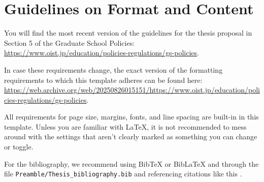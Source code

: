 
\chapter{Guidelines on Format and Content} \label{ch-1}

You will find the most recent version of the guidelines for the thesis proposal in Section 5 of the Graduate School Policies: \url{https://www.oist.jp/education/policies-regulations/gs-policies}.

In case these requirements change, the exact version of the formatting requirements to which this template adheres can be found here: \url{https://web.archive.org/web/20250826015151/https://www.oist.jp/education/policies-regulations/gs-policies}.

All requirements for page size, margins, fonts, and line spacing are built-in
in this template. Unless you are familiar with LaTeX, it is not recommended
to mess around with the settings that aren't clearly marked as something you
can change or toggle.

For the bibliography, we recommend using BibTeX or BibLaTeX and through the file \texttt{Preamble/Thesis\_bibliography.bib} and referencing citations like this \cite{Lee98, Muc10, Kra27}. 
